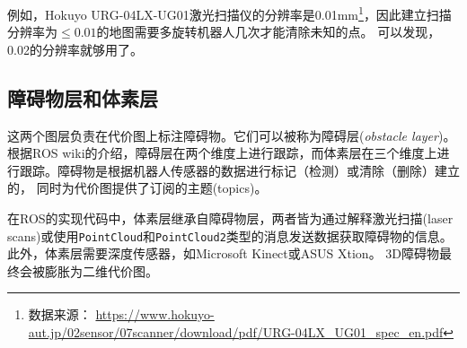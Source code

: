 例如，Hokuyo URG-04LX-UG01激光扫描仪的分辨率是0.01mm\footnote{数据来源： \url{https://www.hokuyo-aut.jp/02sensor/07scanner/download/pdf/URG-04LX_UG01_spec_en.pdf}}，因此建立扫描分辨率为$\leq 0.01$的地图需要多旋转机器人几次才能清除未知的点。
可以发现，0.02的分辨率就够用了。

\subsection[obstacle layer and voxel layer]{障碍物层和体素层}

这两个图层负责在代价图上标注障碍物。它们可以被称为障碍层(\textit{obstacle layer})。根据ROS wiki的介绍，障碍层在两个维度上进行跟踪，而体素层在三个维度上进行跟踪。障碍物是根据机器人传感器的数据进行标记（检测）或清除（删除）建立的，
同时为代价图提供了订阅的主题(topics)。


在ROS的实现代码中，体素层继承自障碍物层，两者皆为通过解释激光扫描(laser scans)或使用\texttt{PointCloud}和\texttt{PointCloud2}类型的消息发送数据获取障碍物的信息。 此外，体素层需要深度传感器，如Microsoft Kinect或ASUS Xtion。 3D障碍物最终会被膨胀为二维代价图。

